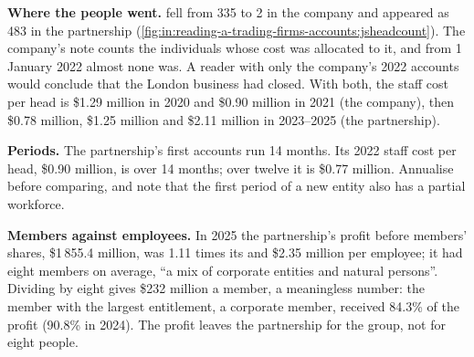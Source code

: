 \textbf{Where the people went.}  fell from 335 to 2 in the company and appeared as 483 in the
partnership (\cref{fig:in:reading-a-trading-firms-accounts:jsheadcount}). The company's note counts the
individuals whose cost was allocated to it, and from 1 January 2022 almost none was. A reader with only the company's
2022 accounts would conclude that the London business had closed. With both, the staff cost per head is \$1.29 million in
2020 and \$0.90 million in 2021 (the company), then \$0.78 million, \$1.25 million and \$2.11 million in 2023--2025 (the
partnership).

\begin{omfigure}

\label{fig:in:reading-a-trading-firms-accounts:jsheadcount}
\end{omfigure}

\textbf{Periods.} The partnership's first accounts run 14 months. Its 2022 staff cost per head, \$0.90 million, is over
14 months; over twelve it is \$0.77 million. Annualise before comparing, and note that the first period of a new entity
also has a partial workforce.

\textbf{Members against employees.} In 2025 the partnership's profit before members' shares, \$1\,855.4 million, was
1.11 times its  and \$2.35 million per employee; it had eight members on average, ``a mix of corporate entities
and natural persons''. Dividing by eight gives \$232 million a member, a meaningless number: the member with the largest
entitlement, a corporate member, received 84.3\% of the profit (90.8\% in 2024). The profit leaves the partnership for the
group, not for eight people.

